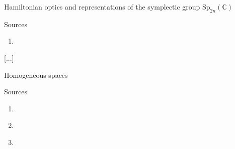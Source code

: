 \documentclass[letterpaper,11pt, reqno]{amsart}
\newtheorem{monodromy theorem}{Monodromy Theorem}[subsection]
\newtheorem{wild conjecture}[theorem]{Wild Conjecture}
\newtheorem{research objectives}{Research objectives}[subsection]
\newtheorem{research question}[theorem]{Research questions}
\newtheorem{aside question}[theorem]{Aside question}
\newtheorem{audio example}[theorem]{\loudspeaker[3] Example}
\newtheorem{blank remark}[theorem]{}
\newtheorem{terminology and comment}[theorem]{Terminology and comment}
\newtheorem{purity hypothesis}[theorem]{Purity hypothesis}
\newtheorem{corollary of the purity hypothesis}[theorem]{Corollary of the purity hypothesis}
\newcommand{\CC} {{\mathbb C}}
\numberwithin{equation}{theorem}
\begin{document}
\vskip 1cm

\begin{section}{Hamiltonian optics and representations of the symplectic group $\text{Sp}_{2n}(\CC)$}

\begin{subsection}{Sources}
	\begin{enumerate}[{\bf\ \ \ \ \ \ 1.}]
	\item
	\cite{GS}
	\end{enumerate}
\end{subsection}
[...]
\end{section}

\vskip 1cm

\begin{section}{Homogeneous spaces}

\begin{subsection}{Sources}
	\begin{enumerate}[{\bf\ \ \ \ \ \ 1.}]
	\item
	\cite{Serre}
	\item
	\cite{Tim}
	\item
	\cite{Schmitt}
	\end{enumerate}
\end{subsection}

\end{section}
\end{document}
